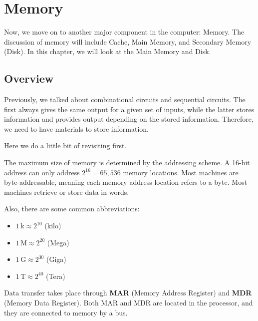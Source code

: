 \chapter{Memory}

Now, we move on to another major component in the computer: Memory. The discussion of memory will include Cache, Main Memory, and Secondary Memory (Disk). In this chapter, we will look at the Main Memory and Disk.

\section{Overview}
Previously, we talked about combinational circuits and sequential circuits. The first always gives the same output for a given set of inputs, while the latter stores information and provides output depending on the stored information. Therefore, we need to have materials to store information.

Here we do a little bit of revisiting first.

The maximum size of memory is determined by the addressing scheme. A 16-bit address can only address \(2^{16} = 65,536\) memory locations. Most machines are byte-addressable, meaning each memory address location refers to a byte. Most machines retrieve or store data in words.

Also, there are some common abbreviations:
\begin{itemize}
  \item \(1\,\text{k} \approx 2^{10}\) (kilo)
  \item \(1\,\text{M} \approx 2^{20}\) (Mega)
  \item \(1\,\text{G} \approx 2^{30}\) (Giga)
  \item \(1\,\text{T} \approx 2^{40}\) (Tera)
\end{itemize}

Data transfer takes place through \textbf{MAR} (Memory Address Register) and \textbf{MDR} (Memory Data Register). Both MAR and MDR are located in the processor, and they are connected to memory by a bus.

